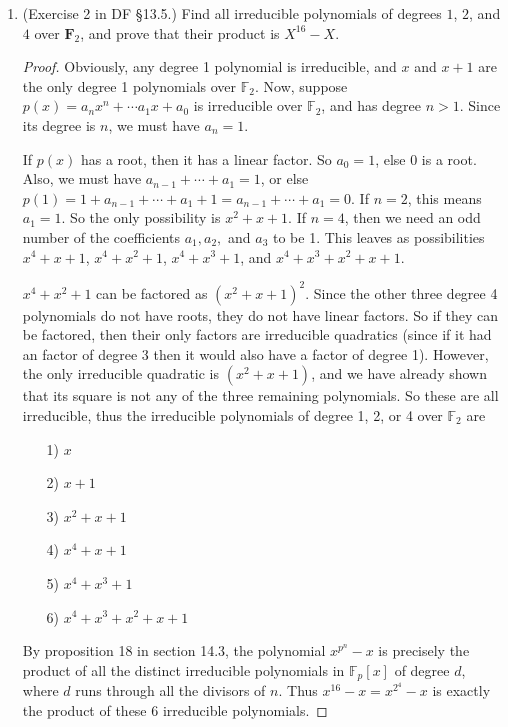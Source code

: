 \documentclass[10pt]{article}
\begin{document}
\begin{enumerate}
\begin{proof}
\end{proof}

\item (Exercise 2 in DF \S 13.5.) Find all irreducible polynomials of degrees $1$, $2$, and $4$ over $\mathbf{F}_2$, and prove that their product is $X^{16}-X$.

\begin{proof}

Obviously, any degree 1 polynomial is irreducible, and $x$ and $x+1$ are the only degree 1 polynomials over $\mathbb{F}_2$.  Now, suppose $p(x) = a_n x^n + \cdots a_1 x + a_0$ is irreducible over $\mathbb{F}_2$, and has degree $n > 1$.  Since its degree is $n$, we must have $a_n = 1$.

If $p(x)$ has a root, then it has a linear factor.  So $a_0 = 1$, else 0 is a root.  Also, we must have $a_{n-1} + \cdots + a_1 = 1$, or else $p(1) = 1 + a_{n-1} + \cdots + a_1 + 1 = a_{n-1} + \cdots + a_1 = 0$.  If $n=2$, this means $a_1 = 1$.  So the only possibility is $x^2 + x + 1$.  If $n=4$, then we need an odd number of the coefficients $a_1, a_2,$ and $a_3$ to be 1.  This leaves as possibilities $x^4 + x + 1$, $x^4 + x^2 + 1$, $x^4 + x^3 + 1$, and $x^4 + x^3 + x^2 + x + 1$.

$x^4 + x^2 + 1$ can be factored as $(x^2 + x + 1)^2$.  Since the other three degree 4 polynomials do not have roots, they do not have linear factors.  So if they can be factored, then their only factors are irreducible quadratics (since if it had an factor of degree 3 then it would also have a factor of degree 1).  However, the only irreducible quadratic is $(x^2 + x + 1)$, and we have already shown that its square is not any of the three remaining polynomials.  So these are all irreducible, thus the irreducible polynomials of degree 1, 2, or 4 over $\mathbb{F}_2$ are
\begin{enumerate}
\item[1)] $x$
\item[2)] $x+1$
\item[3)] $x^2 + x + 1$
\item[4)] $x^4 + x + 1$
\item[5)] $x^4 + x^3 + 1$
\item[6)] $x^4 + x^3 + x^2 + x + 1$
\end{enumerate}
By proposition 18 in section 14.3, the polynomial $x^{p^n} - x$ is precisely the product of all the distinct irreducible polynomials in $\mathbb{F}_p[x]$ of degree $d$, where $d$ runs through all the divisors of $n$.  Thus $x^{16} - x = x^{2^4} - x$ is exactly the product of these 6 irreducible polynomials.


\end{proof}
\end{enumerate}
\end{document}
